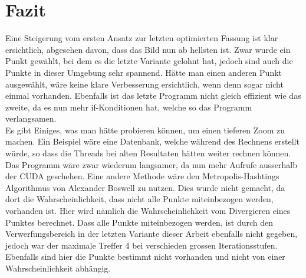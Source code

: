 \section{Fazit}
Eine Steigerung vom ersten Ansatz zur letzten optimierten Fassung ist klar ersichtlich, abgesehen davon, dass das Bild nun ab hellsten ist. Zwar wurde ein Punkt gewählt, bei dem es die letzte Variante gelohnt hat, jedoch sind auch die Punkte in dieser Umgebung sehr spannend. Hätte man einen anderen Punkt ausgewählt, wäre keine klare Verbesserung ersichtlich, wenn denn sogar nicht einmal vorhanden. Ebenfalls ist das letzte Programm nicht gleich effizient wie das zweite, da es nun mehr if-Konditionen hat, welche so das Programm verlangsamen.\\
Es gibt Einiges, was man hätte probieren können, um einen tieferen Zoom zu machen. Ein Beispiel wäre eine Datenbank, welche während des Rechnens erstellt würde, so dass die Threads bei alten Resultaten hätten weiter rechnen können. Das Programm wäre zwar wiederum langsamer, da nun mehr Aufrufe ausserhalb der CUDA geschehen. Eine andere Methode wäre den Metropolis-Hashtings Algorithmus von Alexander Boswell zu nutzen. Dies wurde nicht gemacht, da dort die Wahrscheinlichkeit, dass nicht alle Punkte miteinbezogen werden, vorhanden ist. Hier wird nämlich die Wahrscheinlichkeit vom Divergieren eines Punktes berechnet. Dass alle Punkte miteinbezogen werden, ist durch den Verwerfungsbereich in der letzten Variante dieser Arbeit ebenfalls nicht gegeben, jedoch war der maximale Treffer 4 bei verschieden grossen Iterationsstufen. Ebenfalls sind hier die Punkte bestimmt nicht vorhanden und nicht von einer Wahrscheinlichkeit abhängig.